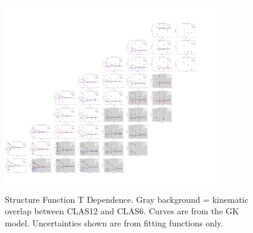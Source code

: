     

    \begin{figure}[ht]
        \centering
        \includegraphics[trim={0 15cm 18cm 13cm},clip,angle=90,origin=c,width=0.85\textwidth]{Chapters/Ch5-Further/GK_model/pics/combined_t_nofold.png}
        \caption[T Dependence of Cross Section]{Structure Function T Dependence. Gray background = kinematic overlap between CLAS12 and CLAS6. Curves are from the GK model. Uncertainties shown are from fitting functions only.}
        \label{fig:t_dependence}
    \end{figure}
    
